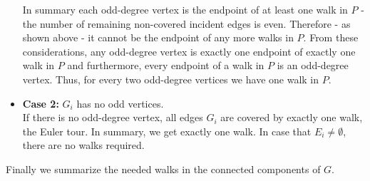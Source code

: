 \documentclass[a4paper]{article}
\begin{document}
\begin{solution}{7}
\begin{theorem}
\begin{itemize}
					In summary each odd-degree vertex is the endpoint of at least one walk in $P$ - the number of remaining non-covered incident edges is even. Therefore - as shown above - it cannot be the endpoint of any more walks in $P$. From these considerations, any odd-degree vertex is exactly one endpoint of exactly one walk in $P$ and furthermore, every endpoint of a walk in $P$ is an odd-degree vertex. Thus, for every two odd-degree vertices we have one walk in $P$.
			
				\item \textbf{Case 2:} $G_i$ has no odd vertices.\\
					If there is no odd-degree vertex, all edges $G_i$ are covered by exactly one walk, the Euler tour. In summary, we get exactly one walk. In case that $E_i \neq \emptyset$, there are no walks required.
			\end{itemize}
			Finally we summarize the needed walks in the connected components of $G$.
		\end{theorem}
	\end{solution}
	
\end{document}
